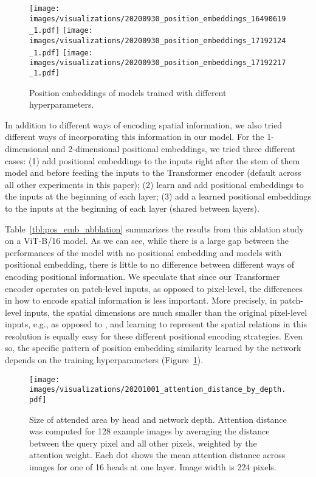 \documentclass{article} \usepackage{iclr2021_conference,times}
\newcommand{\oursabbrv}{ViT\xspace}
\begin{document}
\begin{figure}[t]
\texttt{[image: images/visualizations/20200930\_position\_embeddings\_16490619\_1.pdf]}
\hfill
\texttt{[image: images/visualizations/20200930\_position\_embeddings\_17192124\_1.pdf]}
\hfill
\texttt{[image: images/visualizations/20200930\_position\_embeddings\_17192217\_1.pdf]}
\caption{Position embeddings of models trained with different hyperparameters.}
\label{fig:position_embedding_comparison}
\end{figure}

In addition to different ways of encoding spatial information, we also tried different ways of incorporating this information in our model. For the 1-dimensional and 2-dimensional positional embeddings, we tried three different cases: (1) add positional embeddings to the inputs right after the stem of them model and before feeding the inputs to the Transformer encoder (default across all other experiments in this paper); (2) learn and add positional embeddings to the inputs at the beginning of each layer; (3) add a learned positional embeddings to the inputs at the beginning of each layer (shared between layers).

Table~\ref{tbl:pos_emb_abblation} summarizes the results from this ablation study on a \oursabbrv-B/16 model. As we can see, while there is a large gap between the performances of the model with no positional embedding and models with positional embedding, there is little to no difference between different ways of encoding positional information. We speculate that since our Transformer encoder operates on patch-level inputs, as opposed to pixel-level, the differences in how to encode spatial information is less important. More precisely, in patch-level inputs, the spatial dimensions are much smaller than the original pixel-level inputs, e.g.,  as opposed to , and learning to represent the spatial relations in this resolution is equally easy for these different positional encoding strategies.
Even so, the specific pattern of position embedding similarity learned by the network depends on the training hyperparameters (Figure~\ref{fig:position_embedding_comparison}).

\begin{figure}[h]
\begin{center}
\texttt{[image: images/visualizations/20201001\_attention\_distance\_by\_depth.pdf]}
\end{center}
\caption{Size of attended area by head and network depth. Attention distance was computed for 128 example images by averaging the distance between the query pixel and all other pixels, weighted by the attention weight. Each dot shows the mean attention distance across images for one of 16 heads at one layer. Image width is 224 pixels.}
\label{fig:attention_distance}
\end{figure}
\end{document}

